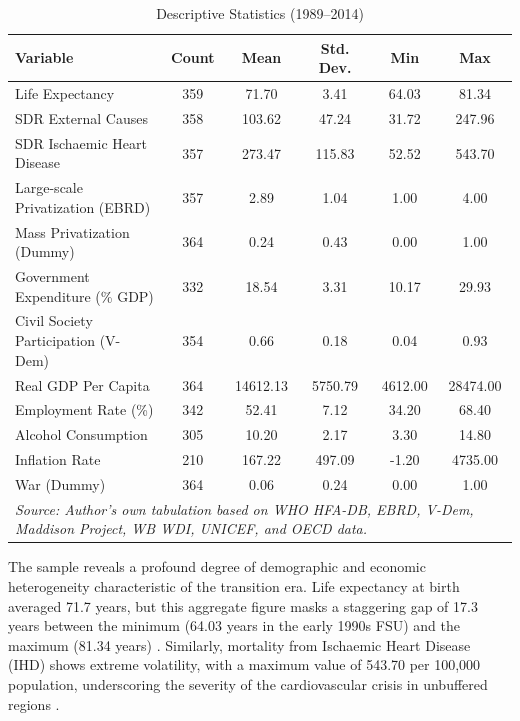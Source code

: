 \documentclass[12pt]{article}
\begin{document}
\begin{table}[ht]
\centering
\caption{Descriptive Statistics (1989--2014)}
\label{tab:desc_stats}
\footnotesize
\begin{tabular}{l c c c c c}
\toprule
\textbf{Variable} & \textbf{Count} & \textbf{Mean} & \textbf{Std. Dev.} & \textbf{Min} & \textbf{Max} \\
\midrule
Life Expectancy & 359 & 71.70 & 3.41 & 64.03 & 81.34 \\
SDR External Causes & 358 & 103.62 & 47.24 & 31.72 & 247.96 \\
SDR Ischaemic Heart Disease & 357 & 273.47 & 115.83 & 52.52 & 543.70 \\
\midrule
Large-scale Privatization (EBRD) & 357 & 2.89 & 1.04 & 1.00 & 4.00 \\
Mass Privatization (Dummy) & 364 & 0.24 & 0.43 & 0.00 & 1.00 \\
Government Expenditure (\% GDP) & 332 & 18.54 & 3.31 & 10.17 & 29.93 \\
Civil Society Participation (V-Dem) & 354 & 0.66 & 0.18 & 0.04 & 0.93 \\
\midrule
Real GDP Per Capita & 364 & 14612.13 & 5750.79 & 4612.00 & 28474.00 \\
Employment Rate (\%) & 342 & 52.41 & 7.12 & 34.20 & 68.40 \\
Alcohol Consumption & 305 & 10.20 & 2.17 & 3.30 & 14.80 \\
Inflation Rate & 210 & 167.22 & 497.09 & -1.20 & 4735.00 \\
War (Dummy) & 364 & 0.06 & 0.24 & 0.00 & 1.00 \\
\bottomrule
\multicolumn{6}{p{0.95\textwidth}}{\scriptsize \textit{Source: Author's own tabulation based on WHO HFA-DB, EBRD, V-Dem, Maddison Project, WB WDI, UNICEF, and OECD data.}} \
\end{tabular}
\end{table}


The sample reveals a profound degree of demographic and economic heterogeneity characteristic of the transition era. Life expectancy at birth averaged 
71.7 years, but this aggregate figure masks a staggering gap of 17.3 years between the minimum (64.03 years in the early 1990s FSU) and the maximum 
(81.34 years) \citep{Brainerd2005}. Similarly, mortality from Ischaemic Heart Disease (IHD) shows extreme volatility, with a maximum value of 543.70 per 
100,000 population, underscoring the severity of the cardiovascular crisis in unbuffered regions \citep{Zaridze2009, Brainerd2001}. 
\end{document}
